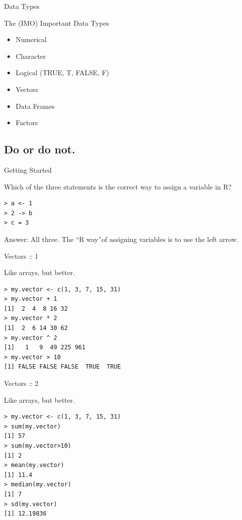 \documentclass{beamer}
\begin{document}
\begin{frame}{Data Types}

     The (IMO) Important Data Types

     \begin{itemize}
        \item Numerical
        \item Character
        \item Logical (TRUE, T, FALSE, F)
        \item Vectors
        \item Data Frames
        \item Factors
    \end{itemize}
\end{frame}

\subsection{Do or do not.}

\begin{frame}[fragile]{Getting Started}

Which of the three statements is the correct way to assign a variable in R?

\begin{verbatim}
> a <- 1
> 2 -> b
> c = 3
\end{verbatim}

Answer: All three. The ``R way''\texttrademark of assigning variables is to use the left arrow.

\end{frame}

\begin{frame}[fragile]{Vectors :: 1}

Like arrays, but better.

\begin{verbatim}
> my.vector <- c(1, 3, 7, 15, 31)
> my.vector + 1
[1]  2  4  8 16 32
> my.vector * 2
[1]  2  6 14 30 62
> my.vector ^ 2
[1]   1   9  49 225 961
> my.vector > 10
[1] FALSE FALSE FALSE  TRUE  TRUE
\end{verbatim}

\end{frame}

\begin{frame}[fragile]{Vectors :: 2}

Like arrays, but better.

\begin{verbatim}
> my.vector <- c(1, 3, 7, 15, 31)
> sum(my.vector)
[1] 57
> sum(my.vector>10)
[1] 2
> mean(my.vector)
[1] 11.4
> median(my.vector)
[1] 7
> sd(my.vector)
[1] 12.19836
\end{verbatim}

\end{frame}
\end{document}
